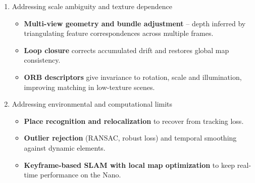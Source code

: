 {
	\begin{enumerate}
		\item Addressing scale ambiguity and texture dependence
		\begin{itemize}
		\item \textbf{Multi-view geometry and bundle adjustment} -- depth inferred by triangulating feature correspondences across multiple frames.
		\item \textbf{Loop closure} corrects accumulated drift and restores global map consistency.
		\item \textbf{ORB descriptors} give invariance to rotation, scale and illumination, improving matching in low-texture scenes.
	\end{itemize}

	\item Addressing environmental and computational limits
	\begin{itemize}
		\item \textbf{Place recognition and relocalization} to recover from tracking loss.
		\item \textbf{Outlier rejection} (RANSAC, robust loss) and temporal smoothing against dynamic elements.
		\item \textbf{Keyframe-based SLAM with local map optimization} to keep real-time performance on the Nano.
	\end{itemize}
\end{enumerate}
}
